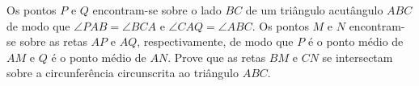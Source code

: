 Os pontos $P$ e $Q$ encontram-se sobre o lado $BC$ de um triângulo acutângulo $ABC$ de modo que
$\angle PAB=\angle BCA$ e $\angle CAQ=\angle ABC$.
Os pontos $M$ e $N$ encontram-se sobre as retas $AP$ e $AQ$, respectivamente, de modo que $P$ é o ponto médio de $AM$ e $Q$ é o ponto médio de $AN$. 
Prove que as retas $BM$ e $CN$ se intersectam sobre a circunferência circunscrita ao triângulo $ABC$.
